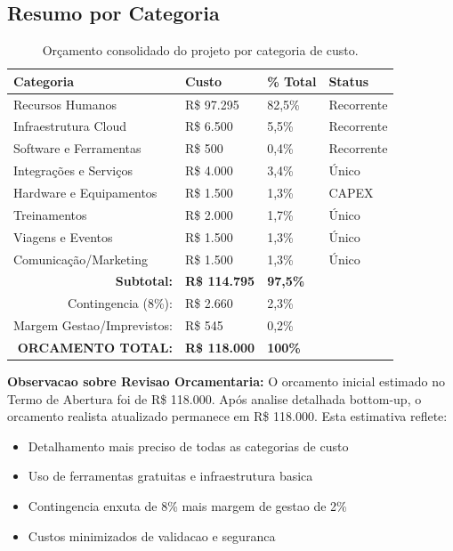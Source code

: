 \subsection{Resumo por Categoria}

\begin{table}[H]
\centering
\caption{Orçamento consolidado do projeto por categoria de custo.}%
\label{tab:orcamento-consolidado}
\small
\begin{tabular}{|p{5cm}|p{3.5cm}|p{2cm}|p{2cm}|}
\hline
\textbf{Categoria} & \textbf{Custo} & \textbf{\% Total} & \textbf{Status} \\ \hline
Recursos Humanos & R\$ 97.295 & 82,5\% & Recorrente \\ \hline
Infraestrutura Cloud & R\$ 6.500 & 5,5\% & Recorrente \\ \hline
Software e Ferramentas & R\$ 500 & 0,4\% & Recorrente \\ \hline
Integrações e Serviços & R\$ 4.000 & 3,4\% & Único \\ \hline
Hardware e Equipamentos & R\$ 1.500 & 1,3\% & CAPEX \\ \hline
Treinamentos & R\$ 2.000 & 1,7\% & Único \\ \hline
Viagens e Eventos & R\$ 1.500 & 1,3\% & Único \\ \hline
Comunicação/Marketing & R\$ 1.500 & 1,3\% & Único \\ \hline
\multicolumn{1}{|r|}{\textbf{Subtotal:}} & \textbf{R\$ 114.795} & \textbf{97,5\%} & \\ \hline
\multicolumn{1}{|r|}{Contingencia (8\%):} & R\$ 2.660 & 2,3\% & \\ \hline
\multicolumn{1}{|r|}{Margem Gestao/Imprevistos:} & R\$ 545 & 0,2\% & \\ \hline
\multicolumn{1}{|r|}{\textbf{ORCAMENTO TOTAL:}} & \textbf{R\$ 118.000} & \textbf{100\%} & \\ \hline
\end{tabular}
\end{table}

\textbf{Observacao sobre Revisao Orcamentaria:}
O orcamento inicial estimado no Termo de Abertura foi de R\$ 118.000. Após analise detalhada bottom-up, o orcamento realista atualizado permanece em R\$ 118.000. Esta estimativa reflete:
\begin{itemize}
    \item Detalhamento mais preciso de todas as categorias de custo
    \item Uso de ferramentas gratuitas e infraestrutura basica
    \item Contingencia enxuta de 8\% mais margem de gestao de 2\%
    \item Custos minimizados de validacao e seguranca
\end{itemize}

